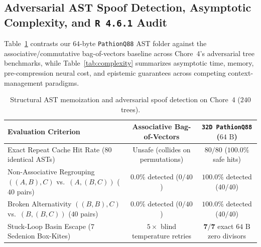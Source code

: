 \documentclass[11pt]{article}
\theoremstyle{plain}
\theoremstyle{definition}
\begin{document}
\subsection{Adversarial AST Spoof Detection, Asymptotic Complexity, and \texttt{R 4.6.1} Audit}

Table~\ref{tab:ast_eval} contrasts our $64$-byte \texttt{PathionQ88} AST folder against the associative/commutative bag-of-vectors baseline across Chore~4's adversarial tree benchmarks, while Table~\ref{tab:complexity} summarizes asymptotic time, memory, pre-compression neural cost, and epistemic guarantees across competing context-management paradigms.

\begin{table}[htbp]
\centering
\caption{Structural AST memoization and adversarial spoof detection on Chore~4 ($240$ trees).}\label{tab:ast_eval}
\vspace{4pt}
\small
\begin{tabular}{@{}lcc@{}}
\toprule
Evaluation Criterion & Associative Bag-of-Vectors & \texttt{32D PathionQ88} ($64\text{ B}$) \\
\midrule
Exact Repeat Cache Hit Rate ($80$ identical ASTs) & Unsafe (collides on permutations) & $80 / 80$ ($100.0\%$ safe hits) \\
Non-Associative Regrouping $((A,B),C)$ vs.\ $(A,(B,C))$ ($40$ pairs) & $0.0\%$ detected ($0/40$) & $\mathbf{100.0\%}$ detected ($40/40$) \\
Broken Alternativity $((B,B),C)$ vs.\ $(B,(B,C))$ ($40$ pairs) & $0.0\%$ detected ($0/40$) & $\mathbf{100.0\%}$ detected ($40/40$) \\
Stuck-Loop Basin Escape ($7$ Sedenion Box-Kites) & $5\times$ blind temperature retries & $\mathbf{7 / 7}$ exact $64\text{ B}$ zero divisors \\
\bottomrule
\end{tabular}
\end{table}
\end{document}
